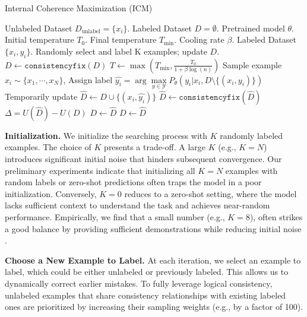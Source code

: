 \documentclass{article}
\newcommand{\ourmethod}[0]{\textsc{ICM}\xspace}
\begin{document}
\begin{algorithm}[!t]
\small
\caption{Internal Coherence Maximization (\ourmethod)}
\begin{algorithmic}[1]
\Require Unlabeled Dataset $D_\text{unlabel}=\{x_i\}$. Labeled Dataset $D=\emptyset$.
Pretrained model $\theta$. Initial temperature $T_0$. Final temperature $T_{\min}$. Cooling rate $\beta$.
\Ensure Labeled Dataset $\{x_i, y_i\}$.
\State Randomly select and label K examples; update $D$. 
\State $D \leftarrow \texttt{consistencyfix}(D)$ 
\State $T \leftarrow \max(T_{\min}, \frac{T_0}{1 + \beta \log(n)})$
\State Sample example $x_i \sim \{x_1, \cdots, x_N\}$, 
\State Assign label $\hat{y_i}=\arg\max\limits_{y\in \mathcal{Y}}P_{\theta}(y_i|x_i, D \setminus \{(x_i, y_i)\})$
\State Temporarily update  $\hat{D} \leftarrow D \cup \{(x_i, \hat{y_i})\}$
\State $\hat{D} \leftarrow \texttt{consistencyfix}(\hat{D})$ 
\State $\Delta = U(\hat{D}) - U(D)$
 
\State $D \leftarrow \hat{D}$
\Else
{} 
\State $D \leftarrow \hat{D}$ 
\EndIf
\EndIf
\EndFor
\end{algorithmic}
\label{alg:main}
\end{algorithm}



\textbf{Initialization.} We initialize the searching process with $K$ randomly labeled examples. The choice of $K$ presents a trade-off. A large $K$ (e.g., $K=N$) introduces significant initial noise that hinders subsequent convergence. Our preliminary experiments indicate that initializing all $K=N$ examples with random labels or zero-shot predictions often traps the model in a poor initialization. Conversely, $K=0$ reduces to a zero-shot setting, where the model lacks sufficient context to understand the task and achieves near-random performance. Empirically, we find that a small number (e.g., $K=8$), often strikes a good balance by providing sufficient demonstrations while reducing initial noise \citep{min-etal-2022-rethinking}.

\textbf{Choose a New Example to Label.} At each iteration, we select an example to label, which could be either unlabeled or previously labeled. This allows us to dynamically correct earlier mistakes. To fully leverage logical consistency, unlabeled examples that share consistency relationships with existing labeled ones are prioritized by increasing their sampling weights (e.g., by a factor of 100).
\end{document}
